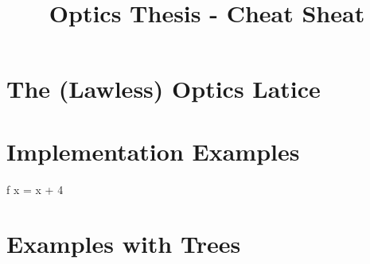 \documentclass{report}
\title{Optics Thesis - Cheat Sheat}
\begin{document}
\maketitle

\chapter{The (Lawless) Optics Latice}



\chapter{Implementation Examples}

\begin{code}
f x = x + 4
\end{code}



\chapter{Examples with Trees}




\end{document}
